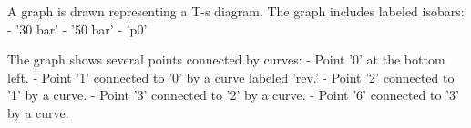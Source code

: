 A graph is drawn representing a T-s diagram. The graph includes labeled isobars:  
- '30 bar'  
- '50 bar'  
- 'p0'  

The graph shows several points connected by curves:  
- Point '0' at the bottom left.  
- Point '1' connected to '0' by a curve labeled 'rev.'  
- Point '2' connected to '1' by a curve.  
- Point '3' connected to '2' by a curve.  
- Point '6' connected to '3' by a curve.
